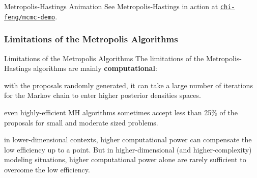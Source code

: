 
\begin{frame}{Metropolis-Hastings Animation}
	See Metropolis-Hastings in action at \href{https://chi-feng.github.io/mcmc-demo/app.html?algorithm=RandomWalkMH&target=banana}{\texttt{chi-feng/mcmc-demo}}.
\end{frame}

\subsubsection{Limitations of the Metropolis Algorithms}
\begin{frame}{Limitations of the Metropolis Algorithms}
	The limitations of the Metropolis-Hastings algorithms are mainly \textbf{computational}:
	\begin{vfilleditems}
		\item with the proposals randomly generated,
		it can take a large number of iterations for the
		Markov chain to enter higher posterior densities spaces.
		\item even highly-efficient MH algorithms sometimes accept less than
		25\% of the proposals \parencite{robertsWeakConvergenceOptimal1997, beskosOptimalTuningHybrid2013} for small and moderate sized problems.
		\item in lower-dimensional contexts, higher computational power can compensate the low efficiency up to a point.
		But in higher-dimensional (and higher-complexity) modeling situations,
		higher computational power alone are rarely sufficient to overcome the low efficiency.
	\end{vfilleditems}
\end{frame}



